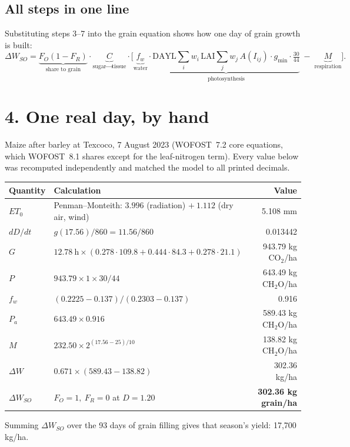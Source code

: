 \documentclass[11pt,a4paper]{article}
\begin{document}
\subsection*{All steps in one line}
Substituting steps 3--7 into the grain equation shows how one day of grain growth is built:
\begin{equation}
  \Delta W_{SO}
  = \underbrace{F_O(1-F_R)}_{\text{share to grain}}\cdot
    \underbrace{C}_{\text{sugar}\to\text{tissue}}\cdot
    \Big[\underbrace{f_w}_{\text{water}}\cdot
    \underbrace{\mathrm{DAYL}\sum_i w_i\,\mathrm{LAI}\sum_j w_j\,A(I_{ij})\cdot g_{\min}\cdot\tfrac{30}{44}}_{\text{photosynthesis}}
    \;-\; \underbrace{M}_{\text{respiration}}\Big].
\end{equation}

\section*{4. One real day, by hand}

Maize after barley at Texcoco, 7 August 2023 (WOFOST~7.2 core equations, which WOFOST~8.1 shares except for the
leaf-nitrogen term). Every value below was recomputed independently and matched the model to all printed decimals.

\begin{table}[h]
\centering\small
\begin{tabularx}{\linewidth}{lYr}
\toprule
Quantity & Calculation & Value \\
\midrule
\(ET_0\) & Penman--Monteith: \(3.996\) (radiation) \(+\ 1.112\) (dry air, wind) & 5.108 mm \\
\(dD/dt\) & \(g(17.56) / 860 = 11.56 / 860\) & 0.013442 \\
\(G\) & \(12.78\ \text{h} \times (0.278\cdot 109.8 + 0.444\cdot 84.3 + 0.278\cdot 21.1)\) & 943.79 kg CO\(_2\)/ha \\
\(P\) & \(943.79 \times 1 \times 30/44\) & 643.49 kg CH\(_2\)O/ha \\
\(f_w\) & \((0.2225 - 0.137) / (0.2303 - 0.137)\) & 0.916 \\
\(P_a\) & \(643.49 \times 0.916\) & 589.43 kg CH\(_2\)O/ha \\
\(M\) & \(232.50 \times 2^{(17.56-25)/10}\) & 138.82 kg CH\(_2\)O/ha \\
\(\Delta W\) & \(0.671 \times (589.43 - 138.82)\) & 302.36 kg/ha \\
\(\Delta W_{SO}\) & \(F_O = 1,\ F_R = 0\) at \(D = 1.20\) & \textbf{302.36 kg grain/ha} \\
\bottomrule
\end{tabularx}
\end{table}
Summing \(\Delta W_{SO}\) over the 93 days of grain filling gives that season's yield: 17{,}700 kg/ha.
\end{document}
